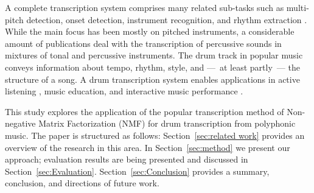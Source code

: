 \documentclass{article}
\newcommand{\secref}[1]{\mbox{Section~\ref{#1}}}
\begin{document}

A complete transcription system comprises many related sub-tasks such as multi-pitch detection, onset detection, instrument recognition, and rhythm extraction \cite{benetos_automatic_2013}. While the main focus has been mostly on pitched instruments, a considerable amount of publications deal with the transcription of percussive sounds in mixtures of tonal and percussive instruments. The drum track in popular music conveys information about tempo, rhythm, style, and ---~at least partly~--- the structure of a song. A drum transcription system enables applications in active listening \cite{yoshii_drumix:_2007}, music education, and interactive music performance \cite{weinberg_interactive_2009}.


This study explores the application of the popular transcription method of Non-negative Matrix Factorization (NMF) for drum transcription from polyphonic music. The paper is structured as follows: \secref{sec:related work} provides an overview of the research in this area. In \secref{sec:method} we present our approach; evaluation results are being presented and discussed in \secref{sec:Evaluation}. \secref{sec:Conclusion} provides a summary, conclusion, and directions of future work. 

\vspace{-2mm}
\end{document}
